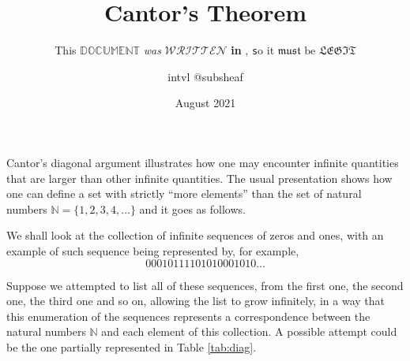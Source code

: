 \documentclass[a4paper]{article}
\title{Cantor's Theorem}
\subtitle{This $\mathbb{DOCUMENT}$ \emph{was} $\mathcal{WRITTEN}$ \textbf{in} \LaTeXe, {\texttt so it} $\mathfrak{must}$ $\mathrm{be}$ $\mathfrak{LEGIT}$}
\author{intvl @subsheaf}
\date{August 2021}
\theoremstyle{definition}
\begin{document}
\maketitle

Cantor's diagonal argument illustrates how one may encounter infinite quantities that are larger than other infinite quantities. The usual presentation shows how one can define a set with strictly ``more elements'' than the set of natural numbers $\mathbb{N} = \{1,2,3,4,\dotsc\}$ and it goes as follows.

We shall look at the collection of infinite sequences of zeros and ones, with an example of such sequence being represented by, for example,
\[
    00010111101010001010\dots
\]

Suppose we attempted to list all of these sequences, from the first one, the second one, the third one and so on, allowing the list to grow infinitely, in a way that this enumeration of the sequences represents a correspondence between the natural numbers $\mathbb{N}$ and each element of this collection. A possible attempt could be the one partially represented in Table \ref{tab:diag}.
\end{document}
